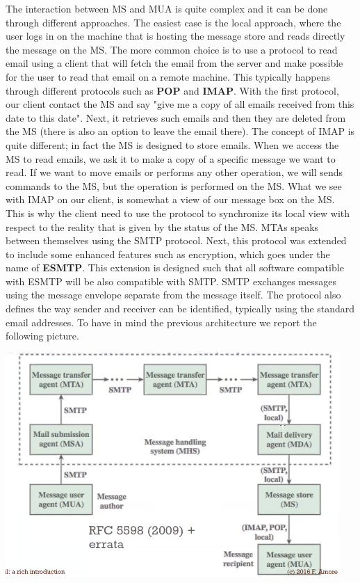 The interaction between MS and MUA is quite complex and it can be done through different approaches. The easiest case is the local approach, where the user logs in on the machine that is hosting the message store and reads directly the message on the MS. The more common choice is to use a protocol to read email using a client that will fetch the email from the server and make possible for the user to read that email on a remote machine. This typically happens through different protocols such as \textbf{POP} and \textbf{IMAP}. With the first protocol, our client contact the MS and say "give me a copy of all emails received from this date to this date". Next, it retrieves such emails and then they are deleted from the MS (there is also an option to leave the email there). The concept of IMAP is quite different; in fact the MS is designed to store emails. When we access the MS to read emails, we ask it to make a copy of a specific message we want to read. If we want to move emails or performs any other operation, we will sends commands to the MS, but the operation is performed on the MS. What we see with IMAP on our client, is somewhat a view of our message box on the MS. This is why the client need to use the protocol to synchronize its local view with respect to the reality that is given by the status of the MS. MTAs speaks between themselves using the SMTP protocol. Next, this protocol was extended to include some enhanced features such as encryption, which goes under the name of \textbf{ESMTP}. This extension is designed such that all software compatible with ESMTP will be also compatible with SMTP. SMTP exchanges messages using the message envelope separate from the message itself. The protocol also defines the way sender and receiver can be identified, typically using the standard email addresses. To have in mind the previous architecture we report the following picture.
\begin{center}
\includegraphics[scale=0.5]{./images/email_architecture.png}
\end{center}
